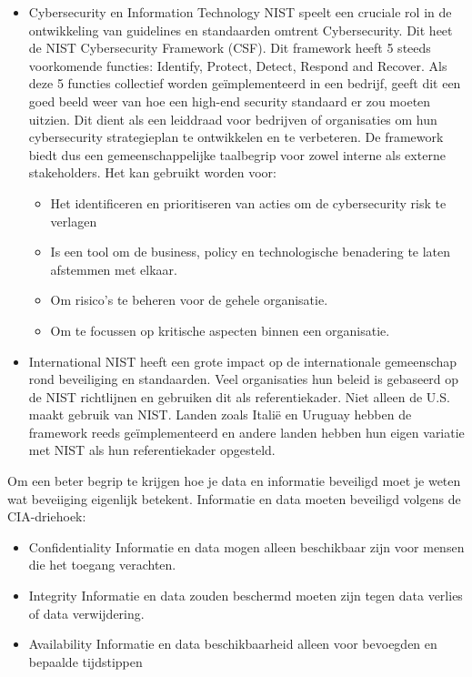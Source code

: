 \begin{itemize}
     \item Cybersecurity en Information Technology
     NIST speelt een cruciale rol in de ontwikkeling van guidelines en standaarden omtrent Cybersecurity. Dit heet de NIST Cybersecurity Framework (CSF).
     Dit framework heeft 5 steeds voorkomende functies: Identify, Protect, Detect, Respond and Recover. \autocite{Ibrahim2018}
     Als deze 5 functies collectief worden geïmplementeerd in een bedrijf, geeft dit een goed beeld weer van hoe een high-end security standaard er zou moeten uitzien.
     Dit dient als een leiddraad voor bedrijven of organisaties om hun cybersecurity strategieplan te ontwikkelen en te verbeteren. \autocite{Almuhammadi2017}
     De framework biedt dus een gemeenschappelijke taalbegrip voor zowel interne als externe stakeholders. Het kan gebruikt worden voor:

     \begin{itemize}
        \item Het identificeren en prioritiseren van acties om de cybersecurity risk te verlagen
        \item Is een tool om de business, policy en technologische benadering te laten afstemmen met elkaar. \autocite{Calder2018}
        \item Om risico's te beheren voor de gehele organisatie.
        \item Om te focussen op kritische aspecten binnen een organisatie.
     \end{itemize}

    \item International
    NIST heeft een grote impact op de internationale gemeenschap rond beveiliging en standaarden. Veel organisaties hun beleid is gebaseerd op de NIST richtlijnen en gebruiken dit als referentiekader.
    Niet alleen de U.S. maakt gebruik van NIST. Landen zoals Italië en Uruguay hebben de framework reeds geïmplementeerd en andere landen hebben hun eigen variatie met NIST als hun referentiekader opgesteld. \autocite{Calder2018}
\end{itemize}

Om een beter begrip te krijgen hoe je data en informatie beveiligd moet je weten wat beveiiging eigenlijk betekent. Informatie en data moeten beveiligd volgens de CIA-driehoek: \autocite{Calder2018}
\begin{itemize}
    \item Confidentiality
    Informatie en data mogen alleen beschikbaar zijn voor mensen die het toegang verachten.
    \item Integrity
    Informatie en data zouden beschermd moeten zijn tegen data verlies of data verwijdering.
    \item Availability
    Informatie en data beschikbaarheid alleen voor bevoegden en bepaalde tijdstippen
\end{itemize}

